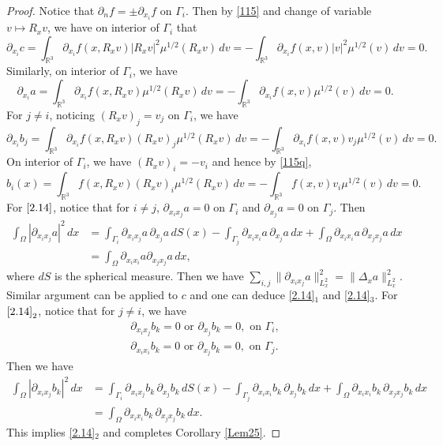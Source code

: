 \documentclass[reqno,a4paper]{amsart}
\numberwithin{equation}{section}
\newcommand{\1}{\mathbf{1}}
\newcommand{\R}{\mathbb{R}}
\newcommand{\<}{\langle}
\renewcommand{\>}{\rangle}
\begin{document}
\begin{proof}
	Notice that $\partial_nf = \pm\partial_{x_i}f$ on $\Gamma_i$. Then
	by \eqref{115} and change of variable $v\mapsto R_xv$, we have on interior of $\Gamma_i$ that 
	\begin{equation*}
		\partial_{x_i}c = \int_{\R^3}\partial_{x_i}f(x,R_xv)|R_xv|^2\mu^{1/2}(R_xv)\,dv
		= -\int_{\R^3}\partial_{x_i}f(x,v)|v|^2\mu^{1/2}(v)\,dv = 0. 
	\end{equation*}
	Similarly, on interior of $\Gamma_i$, we have 
	\begin{equation*}
		\partial_{x_i}a = \int_{\R^3}\partial_{x_i}f(x,R_xv)\mu^{1/2}(R_xv)\,dv
		= -\int_{\R^3}\partial_{x_i}f(x,v)\mu^{1/2}(v)\,dv = 0.  
	\end{equation*}
	For $j\neq i$, noticing $(R_xv)_j=v_j$ on $\Gamma_i$, we have 
	\begin{equation*}
		\partial_{x_i}b_j = \int_{\R^3}\partial_{x_i}f(x,R_xv)(R_xv)_j\mu^{1/2}(R_xv)\,dv
		= -\int_{\R^3}\partial_{x_i}f(x,v)v_j\mu^{1/2}(v)\,dv = 0.  
	\end{equation*}
	On interior of $\Gamma_i$, we have $(R_xv)_i=-v_i$ and hence by \eqref{115q}, 
	\begin{equation*}
		b_i(x) = \int_{\R^3}f(x,R_xv)(R_xv)_i\mu^{1/2}(R_xv)\,dv
		= -\int_{\R^3}f(x,v)v_i\mu^{1/2}(v)\,dv = 0. 
	\end{equation*}
	For $\eqref{2.14}$, notice that for $i\neq j$, $\partial_{x_ix_j}a = 0$ on $\Gamma_i$ and $\partial_{x_j}a=0$ on $\Gamma_j$. Then 
	\begin{align*}
		\int_{\Omega}|\partial_{x_ix_j}a|^2\,dx
		&= \int_{\Gamma_i}\partial_{x_ix_j}a\,\partial_{x_j}a\,dS(x) - \int_{\Gamma_j}\partial_{x_ix_i}a\,\partial_{x_j}a\,dx + \int_{\Omega}\partial_{x_ix_i}a\,\partial_{x_jx_j}a\,dx
		\\&= \int_{\Omega}\partial_{x_ix_i}a\partial_{x_jx_j}a\,dx, 
	\end{align*}
	where $dS$ is the spherical measure. Then we have $\sum_{i,j}\|\partial_{x_ix_j}a\|^2_{L^2_x} = \|\Delta_xa\|^2_{L^2_x}$. Similar argument can be applied to $c$ and one can deduce \eqref{2.14}$_1$ and \eqref{2.14}$_3$. 
	For $\eqref{2.14}_2$, notice that for $j\neq i$, we have 
	\begin{align*}
		\partial_{x_ix_j}b_k= 0 \text{  or  }\partial_{x_j}b_k=0, \text{  on }\Gamma_i,\\
		\partial_{x_ix_i}b_k= 0 \text{  or  }\partial_{x_j}b_k=0, \text{  on }\Gamma_j.
	\end{align*}
	Then we have 
	\begin{align*}
		\int_{\Omega}|\partial_{x_ix_j}b_k|^2\,dx
		&= \int_{\Gamma_i}\partial_{x_ix_j}b_k\,\partial_{x_j}b_k\,dS(x) - \int_{\Gamma_j}\partial_{x_ix_i}b_k\,\partial_{x_j}b_k\,dx + \int_{\Omega}\partial_{x_ix_i}b_k\,\partial_{x_jx_j}b_k\,dx
		\\&= \int_{\Omega}\partial_{x_ix_i}b_k\,\partial_{x_jx_j}b_k\,dx. 
	\end{align*}This implies \eqref{2.14}$_2$ and completes Corollary \ref{Lem25}. 
\end{proof}	
	
\end{document}
